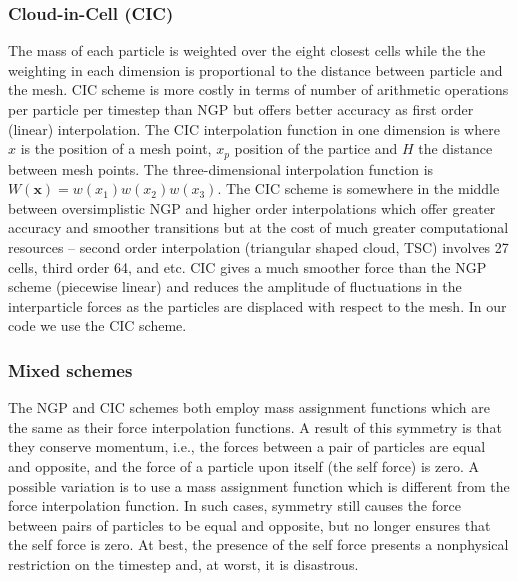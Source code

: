 \subsubsection{Cloud-in-Cell (CIC)}
The mass of each particle is weighted over the eight closest cells while the the weighting in each dimension is proportional to the distance between particle and the mesh. CIC scheme is more costly in terms of number of arithmetic operations per particle per timestep than NGP but offers better accuracy as first order (linear) interpolation. The CIC interpolation function in one dimension is
where $x$ is the position of a mesh point, $x_p$ position of the partice and $H$ the distance between mesh points. The three-dimensional interpolation function is \(W(\mathbf x)=w(x_1)w(x_2)w(x_3)\). The CIC scheme is somewhere in the middle between oversimplistic NGP and higher order interpolations which offer greater accuracy and smoother transitions but at the cost of much greater computational resources -- second order interpolation (triangular shaped cloud, TSC) involves 27 cells, third order 64, and etc. CIC gives a much smoother force than the NGP scheme (piecewise linear) and reduces the amplitude of fluctuations in the interparticle forces as the particles are displaced with respect to the mesh. In our code we use the CIC scheme.
\subsubsection{Mixed schemes}
The NGP and CIC schemes both employ mass assignment functions which are the same as their force interpolation functions. A result of this symmetry is that they conserve momentum, i.e., the forces between a pair of particles are equal and opposite, and the force of a particle upon itself (the self force) is zero. A possible variation is to use a mass assignment function which is different from the force interpolation function. In such cases, symmetry still causes the force between pairs of particles to be equal and opposite, but no longer ensures that the self force is zero. At best, the presence of the self force presents a nonphysical restriction on the timestep and, at worst, it is disastrous.

